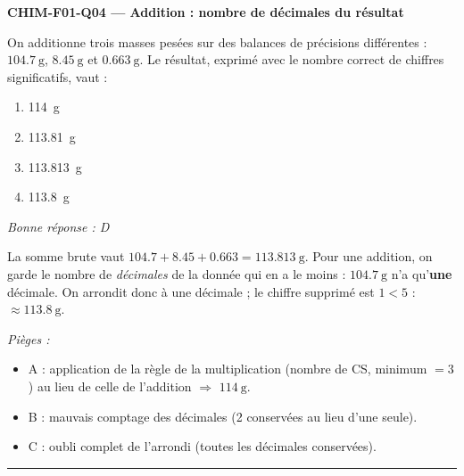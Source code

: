 \documentclass[11pt,a4paper]{article}
\begin{document}
\noindent\textbf{CHIM-F01-Q04 --- Addition : nombre de décimales du résultat}\par
On additionne trois masses pesées sur des balances de précisions différentes : $\qty{104.7}{\gram}$, $\qty{8.45}{\gram}$ et $\qty{0.663}{\gram}$. Le résultat, exprimé avec le nombre correct de chiffres significatifs, vaut :
\begin{enumerate}[label=\Alph*)]
\item \qty{114}{\gram}
\item \qty{113.81}{\gram}
\item \qty{113.813}{\gram}
\item \qty{113.8}{\gram}
\end{enumerate}
\textit{Bonne réponse : D}\par
La somme brute vaut $\num{104.7}+\num{8.45}+\num{0.663} = \num{113.813}\ \si{\gram}$. Pour une addition, on garde le nombre de \emph{décimales} de la donnée qui en a le moins : $\qty{104.7}{\gram}$ n'a qu'\textbf{une} décimale. On arrondit donc à une décimale ; le chiffre supprimé est $1 < 5$ : $\approx \qty{113.8}{\gram}$.\par
\textit{Pièges :}
\begin{itemize}
\item A : application de la règle de la multiplication (nombre de CS, minimum $= 3$) au lieu de celle de l'addition $\Rightarrow$ $\qty{114}{\gram}$.
\item B : mauvais comptage des décimales (2 conservées au lieu d'une seule).
\item C : oubli complet de l'arrondi (toutes les décimales conservées).
\end{itemize}
\vspace{6pt}\hrule\vspace{8pt}
\end{document}
